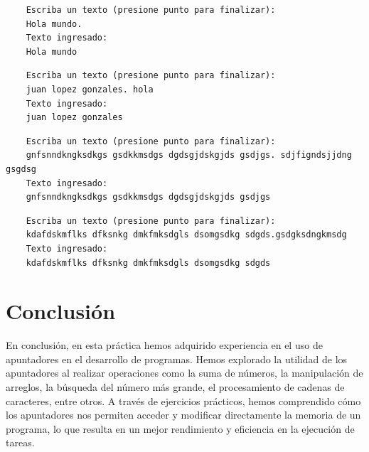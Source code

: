 \documentclass{article}
\begin{document}
	\begin{lstlisting}
	Escriba un texto (presione punto para finalizar):
	Hola mundo.
	Texto ingresado:
	Hola mundo
	\end{lstlisting}
	
	\begin{lstlisting}
	Escriba un texto (presione punto para finalizar):
	juan lopez gonzales. hola
	Texto ingresado:
	juan lopez gonzales
	\end{lstlisting}
	
	\begin{lstlisting}
	Escriba un texto (presione punto para finalizar):
	gnfsnndkngksdkgs gsdkkmsdgs dgdsgjdskgjds gsdjgs. sdjfigndsjjdng gsgdsg
	Texto ingresado:
	gnfsnndkngksdkgs gsdkkmsdgs dgdsgjdskgjds gsdjgs
	\end{lstlisting}
	
	\begin{lstlisting}
	Escriba un texto (presione punto para finalizar):
	kdafdskmflks dfksnkg dmkfmksdgls dsomgsdkg sdgds.gsdgksdngkmsdg
	Texto ingresado:
	kdafdskmflks dfksnkg dmkfmksdgls dsomgsdkg sdgds
	\end{lstlisting}
	
	\newpage
	\section{Conclusión}
	
	En conclusión, en esta práctica hemos adquirido experiencia en el uso de apuntadores en el desarrollo de programas. Hemos explorado la utilidad de los apuntadores al realizar operaciones como la suma de números, la manipulación de arreglos, la búsqueda del número más grande, el procesamiento de cadenas de caracteres, entre otros. A través de ejercicios prácticos, hemos comprendido cómo los apuntadores nos permiten acceder y modificar directamente la memoria de un programa, lo que resulta en un mejor rendimiento y eficiencia en la ejecución de tareas.
	
\end{document}
